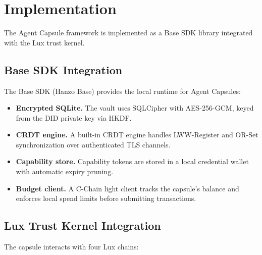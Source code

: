 

\section{Implementation}
\label{sec:implementation}

The Agent Capsule framework is implemented as a Base SDK library integrated with the Lux trust kernel.

\subsection{Base SDK Integration}

The Base SDK (Hanzo Base) provides the local runtime for Agent Capsules:

\begin{itemize}
    \item \textbf{Encrypted SQLite.} The vault uses SQLCipher with AES-256-GCM, keyed from the DID private key via HKDF.
    \item \textbf{CRDT engine.} A built-in CRDT engine handles LWW-Register and OR-Set synchronization over authenticated TLS channels.
    \item \textbf{Capability store.} Capability tokens are stored in a local credential wallet with automatic expiry pruning.
    \item \textbf{Budget client.} A C-Chain light client tracks the capsule's balance and enforces local spend limits before submitting transactions.
\end{itemize}

\subsection{Lux Trust Kernel Integration}

The capsule interacts with four Lux chains:

